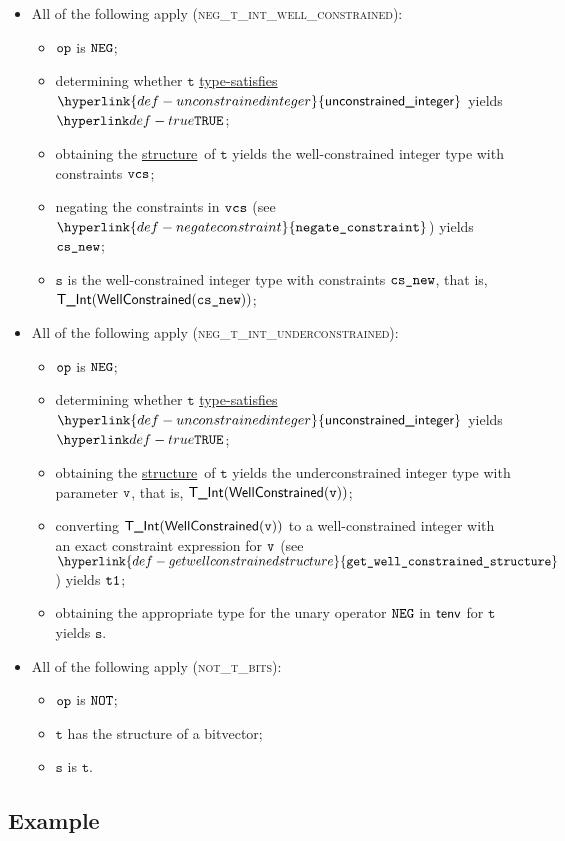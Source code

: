 \documentclass{book}
\newcommand\ProseOrTypeError[0]{\ProseTerminateAs{\TypeErrorConfig}}
\newcommand\unconstrainedinteger[0]{\hyperlink{def-unconstrainedinteger}{\textsf{unconstrained\_integer}}}
\newcommand\negateconstraint[0]{\hyperlink{def-negateconstraint}{\texttt{negate\_constraint}}}
\newcommand\getwellconstrainedstructure[0]{\hyperlink{def-getwellconstrainedstructure}{\texttt{get\_well\_constrained\_structure}}}
\newcommand\structure[0]{\hyperlink{def-structure}{structure}}
\newcommand\typesatisfies[0]{\hyperlink{def-typesatisfies}{type-satisfies}}
\newcommand\vt[0]{\texttt{t}}
\newcommand\vs[0]{\texttt{s}}
\begin{document}
\begin{itemize}
\item All of the following apply (\textsc{neg\_t\_int\_well\_constrained}):
\begin{itemize}
  \item $\texttt{op}$ is $\texttt{NEG}$;
  \item determining whether $\vt$ \typesatisfies\ $\unconstrainedinteger$ yields $\True$\ProseOrTypeError;
  \item obtaining the \structure\ of $\vt$ yields the well-constrained integer type with constraints $\texttt{vcs}$\ProseOrTypeError;
  \item negating the constraints in $\texttt{vcs}$ (see $\negateconstraint$) yields $\texttt{cs\_new}$;
  \item $\vs$ is the well-constrained integer type with constraints $\texttt{cs\_new}$, that is, \\
  $\textsf{T\_Int}(\textsf{WellConstrained}(\texttt{cs\_new}))$;
\end{itemize}

\item All of the following apply (\textsc{neg\_t\_int\_underconstrained}):
\begin{itemize}
  \item $\texttt{op}$ is $\texttt{NEG}$;
  \item determining whether $\vt$ \typesatisfies\ $\unconstrainedinteger$ yields $\True$\ProseOrTypeError;
  \item obtaining the \structure\ of $\vt$ yields the underconstrained integer type with parameter $\texttt{v}$, that is,
  $\textsf{T\_Int}(\textsf{WellConstrained}(\texttt{v}))$\ProseOrTypeError;
  \item converting $\textsf{T\_Int}(\textsf{WellConstrained}(\texttt{v}))$ to a well-constrained integer with an exact constraint expression for $\texttt{v}$
  (see $\getwellconstrainedstructure$) yields $\texttt{t1}$;
  \item obtaining the appropriate type for the unary operator $\texttt{NEG}$ in $\textsf{tenv}$ for $\vt$ yields $\vs$.
\end{itemize}

\item All of the following apply (\textsc{not\_t\_bits}):
  \begin{itemize}
  \item $\texttt{op}$ is $\texttt{NOT}$;
  \item $\vt$ has the structure of a bitvector;
  \item $\vs$ is $\vt$.
  \end{itemize}
\end{itemize}

\subsection{Example}
\end{document}

